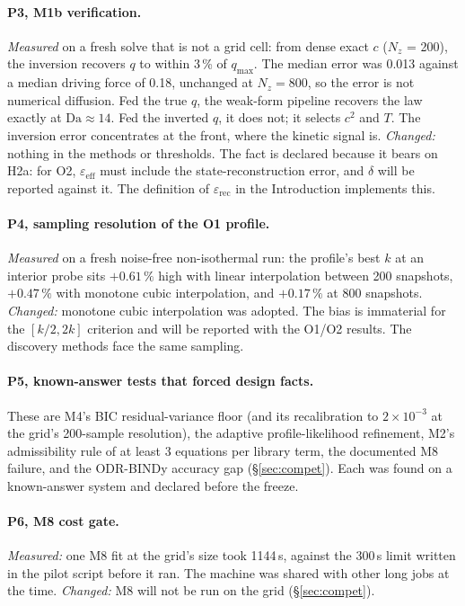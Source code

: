 \documentclass[11pt]{article}
\newcommand{\Da}{\mathrm{Da}}
\begin{document}
\paragraph{P3, M1b verification.}
\emph{Measured} on a fresh solve that is not a grid cell: from dense exact $c$ ($N_z$ =
200), the inversion recovers $q$ to within 3\,\% of $q_{\max}$. The median error was 0.013
against a median driving force of 0.18, unchanged at $N_z = 800$, so the error is not
numerical diffusion. Fed the true $q$, the weak-form pipeline recovers the law exactly at
$\Da \approx 14$. Fed the inverted $q$, it does not; it selects $c^{2}$ and $T$. The
inversion error concentrates at the front, where the kinetic signal is.
\emph{Changed:} nothing in the methods or thresholds. The fact is declared because it bears
on H2a: for O2, $\varepsilon_{\mathrm{eff}}$ must include the state-reconstruction error,
and $\delta$ will be reported against it. The definition of $\varepsilon_{\mathrm{rec}}$ in
the Introduction implements this.

\paragraph{P4, sampling resolution of the O1 profile.}
\emph{Measured} on a fresh noise-free non-isothermal run: the profile's best $k$ at an
interior probe sits $+0.61\,\%$ high with linear interpolation between 200 snapshots,
$+0.47\,\%$ with monotone cubic interpolation, and $+0.17\,\%$ at 800 snapshots.
\emph{Changed:} monotone cubic interpolation was adopted. The bias is immaterial for the
$[k/2, 2k]$ criterion and will be reported with the O1/O2 results. The discovery methods
face the same sampling.

\paragraph{P5, known-answer tests that forced design facts.}
These are M4's BIC residual-variance floor (and its recalibration to $2\times10^{-3}$ at
the grid's 200-sample resolution), the adaptive profile-likelihood refinement, M2's
admissibility rule of at least 3 equations per library term, the documented M8 failure, and
the ODR-BINDy accuracy gap (\S\ref{sec:compet}). Each was found on a known-answer system and
declared before the freeze.

\paragraph{P6, M8 cost gate.}
\emph{Measured:} one M8 fit at the grid's size took 1144\,s, against the 300\,s limit
written in the pilot script before it ran. The machine was shared with other long jobs at
the time. \emph{Changed:} M8 will not be run on the grid (\S\ref{sec:compet}).
\end{document}
